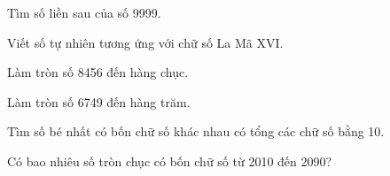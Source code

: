 \begin{ex} %
Tìm số liền sau của số 9999.
\end{ex}

\begin{ex} %
Viết số tự nhiên tương ứng với chữ số La Mã $\text{XVI}$.
\end{ex}

\begin{ex} %
Làm tròn số 8456 đến hàng chục.
\end{ex}

\begin{ex} %
Làm tròn số 6749 đến hàng trăm.
\end{ex}

\begin{ex} %
Tìm số bé nhất có bốn chữ số khác nhau có tổng các chữ số bằng 10.
\end{ex}

\begin{ex} %
Có bao nhiêu số tròn chục có bốn chữ số từ 2010 đến 2090?
\end{ex}
